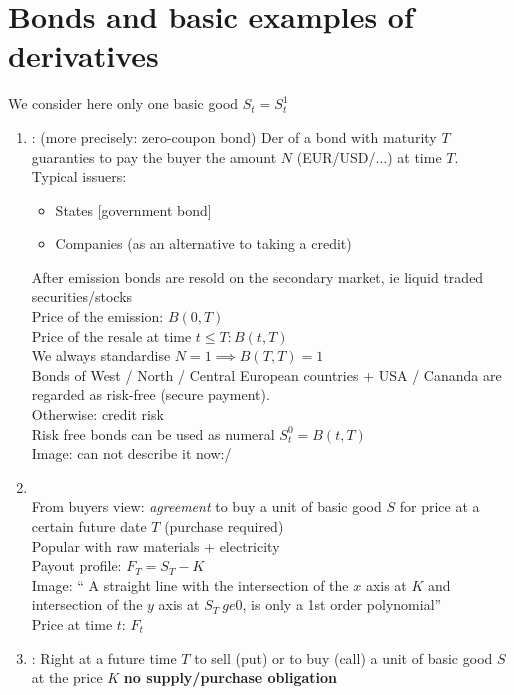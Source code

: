 \section{Bonds and basic examples of derivatives}
We consider here only one basic good $S_t = S^1_t$
\begin{enumerate}
	\item {}: (more precisely: zero-coupon bond) Der  of a bond with maturity $T$ guaranties to pay the buyer the amount $N$ (EUR/USD/...) at time $T$.\\
	Typical issuers:
	\begin{itemize}
		\item States [government bond]
		\item Companies (as an alternative to taking a credit)
	\end{itemize}
    After emission bonds are resold on the secondary market, ie liquid traded securities/stocks\\
	Price of the emission: $B(0,T)$\\
	Price of the resale at time $t \le T\colon B(t,T)$\\
	We always standardise $N=1 \implies B(T,T) =1$\\
	Bonds of West / North / Central European countries + USA / Cananda are regarded as risk-free (secure payment).\\
	Otherwise: credit risk\\
	Risk free bonds can be used as numeral $S^0_t = B(t,T)$\\
	Image: can not describe it now:/ \\
	\item {}\\
	From buyers view: \emph{agreement} to buy a unit of basic good $S$ for price at a certain future date $T$ (purchase required)\\
	Popular with raw materials + electricity \\
	Payout profile: $F_T = S_T - K$\\
    Image: `` A straight line with the intersection of the $x$ axis at $K$ and intersection of the $y$ axis at $S_T \ ge 0$, is only a 1st order polynomial''\\
	Price at time $t$: $F_t$
	\item {}:
	Right at a future time $T$ to sell (put) or to buy (call) a unit of basic good $S$ at the price $K$ \textbf{no supply/purchase obligation}\\

\end{enumerate}
